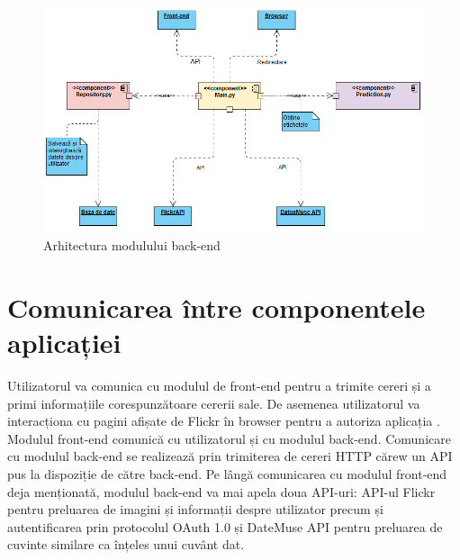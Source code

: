  \begin{figure}[!htbp]
    \begin{center}
        \includegraphics[width=1.0\textwidth]{images/back_end.png}
        \caption{Arhitectura modulului back-end}
    \end{center}
\end{figure}


\pagebreak
\section{Comunicarea între componentele aplicației}
Utilizatorul va comunica cu modulul de front-end pentru a trimite cereri și a primi informațiile corespunzătoare cererii sale. De asemenea utilizatorul va interacționa cu pagini afișate de Flickr în browser pentru a autoriza aplicația {\applicationtitle}.
Modulul front-end comunică cu utilizatorul și cu modulul back-end. Comunicare cu modulul back-end se realizează prin trimiterea de cereri HTTP cărew un API pus la dispoziție de către back-end.
Pe lângă comunicarea cu modulul front-end deja menționată, modulul back-end va mai apela doua API-uri: API-ul Flickr pentru preluarea de imagini și informații despre utilizator precum și autentificarea prin protocolul OAuth 1.0 și DateMuse API pentru preluarea de cuvinte similare ca înțeles unui cuvânt dat.



